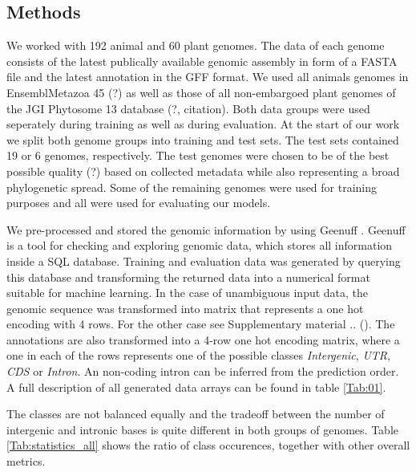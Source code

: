 \documentclass{bioinfo}
\begin{document}
\begin{methods}
\section{Methods}
We worked with 192 animal and 60 plant genomes. The data of each genome consists of the latest publically available genomic assembly in form of a FASTA file and the latest annotation in the GFF format. We used all animals genomes in EnsemblMetazoa 45 (?) \citealp{Howe19} as well as those of all non-embargoed plant genomes of the JGI Phytosome 13 database (?, citation). Both data groups were used seperately during training as well as during evaluation. At the start of our work we split both genome groups into training and test sets. The test sets contained 19 or 6 genomes, respectively. The test genomes were chosen to be of the best possible quality (?) based on collected metadata while also representing a broad phylogenetic spread. Some of the remaining genomes were used for training purposes and all were used for evaluating our models. 

We pre-processed and stored the genomic information by using Geenuff \citealp{Denton19}. Geenuff is a tool for checking and exploring genomic data, which stores all information inside a SQL database. Training and evaluation data was generated by querying this database and transforming the returned data into a numerical format suitable for machine learning. In the case of unambiguous input data, the genomic sequence was transformed into matrix that represents a one hot encoding with 4 rows. For the other case see Supplementary material .. (). The annotations are also transformed into a 4-row one hot encoding matrix, where a one in each of the rows represents one of the possible classes {\it Intergenic}, {\it UTR}, {\it CDS} or {\it Intron}. An non-coding intron can be inferred from the prediction order. A full description of all generated data arrays can be found in table \ref{Tab:01}.

The classes are not balanced equally and the tradeoff between the number of intergenic and intronic bases is quite different in both groups of genomes. Table \ref{Tab:statistics_all} shows the ratio of class occurences, together with other overall metrics.


\end{methods}
\end{document}
